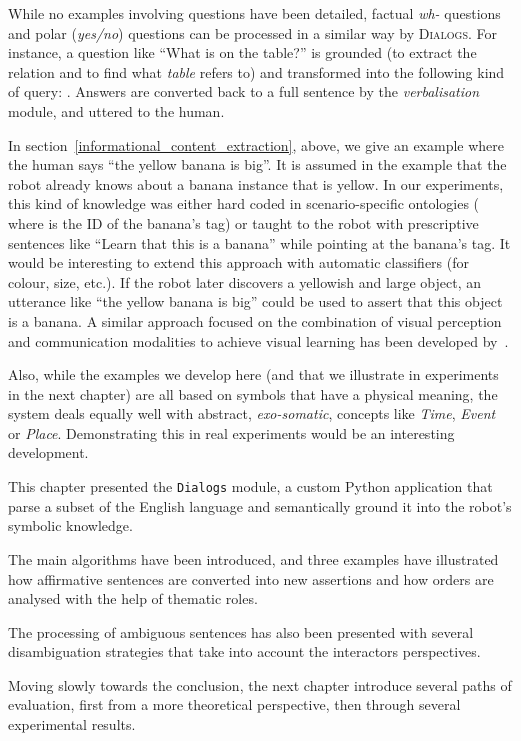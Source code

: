  
While no examples involving questions have been detailed, factual \emph{wh-}
questions and polar (\emph{yes/no}) questions can be processed in a similar way
by \textsc{Dialogs}. For instance, a question like ``What is on the table?'' is
grounded (to extract the relation  and to find what \emph{table}
refers to) and transformed into the following kind of query: .  Answers are converted back to a full sentence by
the \emph{verbalisation} module, and uttered to the human.


In section~\ref{informational_content_extraction}, above, we give an example
where the human says ``the yellow banana is big''. It is assumed in the example
that the robot already knows about a banana instance that is yellow. In our
experiments, this kind of knowledge was either hard coded in scenario-specific
ontologies (\eg {} where  is the
ID of the banana's tag) or taught to the robot with prescriptive sentences like
``Learn that this is a banana'' while pointing at the banana's tag. It would be
interesting to extend this approach with automatic classifiers (for colour,
size, etc.). If the robot later discovers a yellowish and large object, an
utterance like ``the yellow banana is big'' could be used to assert that this
object is a banana.  A similar approach focused on the combination of visual
perception and communication modalities to achieve visual learning has been
developed by~\cite{Vrecko2009}.

Also, while the examples we develop here (and that we illustrate in experiments
in the next chapter) are all based on symbols that have a physical meaning, the
system deals equally well with abstract, \emph{exo-somatic}, concepts like
\emph{Time}, \emph{Event} or \emph{Place}. Demonstrating this in real
experiments would be an interesting development.

\recap

This chapter presented the {\tt Dialogs} module, a custom Python application
that parse a subset of the English language and semantically ground it into the
robot's symbolic knowledge.

The main algorithms have been introduced, and three examples have illustrated
how affirmative sentences are converted into new assertions and how orders are
analysed with the help of thematic roles.

The processing of ambiguous sentences has also been presented with several
disambiguation strategies that take into account the interactors perspectives.

Moving slowly towards the conclusion, the next chapter introduce several paths
of evaluation, first from a more theoretical perspective, then through several
experimental results.


